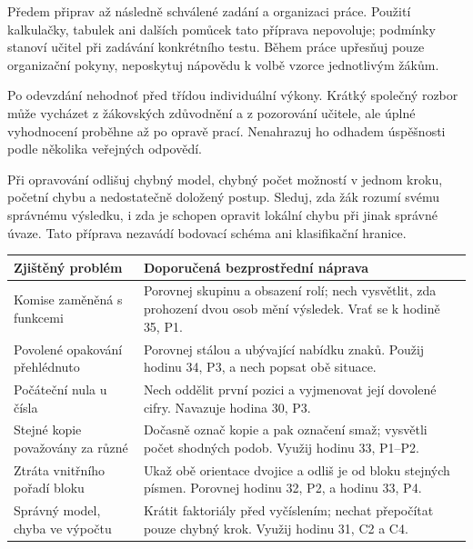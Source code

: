 \documentclass[11pt,a4paper]{article}
\begin{document}

\newpage
{}

Předem připrav až následně schválené zadání a organizaci práce. Použití kalkulačky, tabulek ani dalších pomůcek tato příprava nepovoluje; podmínky stanoví učitel při zadávání konkrétního testu. Během práce upřesňuj pouze organizační pokyny, neposkytuj nápovědu k volbě vzorce jednotlivým žákům.

Po odevzdání nehodnoť před třídou individuální výkony. Krátký společný rozbor může vycházet z žákovských zdůvodnění a z pozorování učitele, ale úplné vyhodnocení proběhne až po opravě prací. Nenahrazuj ho odhadem úspěšnosti podle několika veřejných odpovědí.

Při opravování odlišuj chybný model, chybný počet možností v jednom kroku, početní chybu a nedostatečně doložený postup. Sleduj, zda žák rozumí svému správnému výsledku, i zda je schopen opravit lokální chybu při jinak správné úvaze. Tato příprava nezavádí bodovací schéma ani klasifikační hranice.

\begin{tabularx}{\linewidth}{@{}>{\raggedright\arraybackslash}p{44mm}X@{}}
\toprule
\textbf{Zjištěný problém} & \textbf{Doporučená bezprostřední náprava}\\\midrule
Komise zaměněná s funkcemi & Porovnej skupinu a obsazení rolí; nech vysvětlit, zda prohození dvou osob mění výsledek. Vrať se k hodině 35, P1.\\
Povolené opakování přehlédnuto & Porovnej stálou a ubývající nabídku znaků. Použij hodinu 34, P3, a nech popsat obě situace.\\
Počáteční nula u čísla & Nech oddělit první pozici a vyjmenovat její dovolené cifry. Navazuje hodina 30, P3.\\
Stejné kopie považovány za různé & Dočasně označ kopie a pak označení smaž; vysvětli počet shodných podob. Využij hodinu 33, P1–P2.\\
Ztráta vnitřního pořadí bloku & Ukaž obě orientace dvojice a odliš je od bloku stejných písmen. Porovnej hodinu 32, P2, a hodinu 33, P4.\\
Správný model, chyba ve výpočtu & Krátit faktoriály před vyčíslením; nechat přepočítat pouze chybný krok. Využij hodinu 31, C2 a C4.\\
\bottomrule
\end{tabularx}
\end{document}
